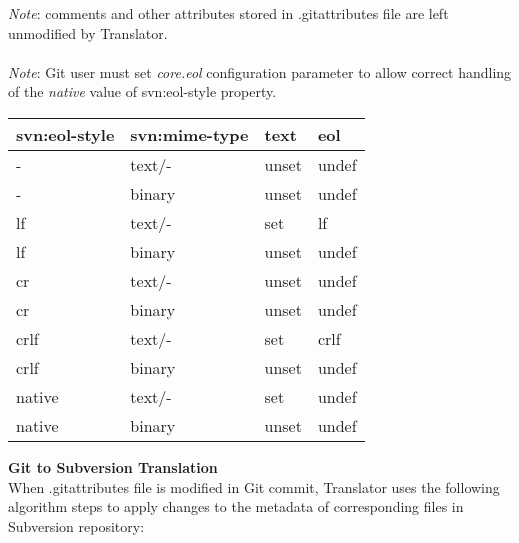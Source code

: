 \emph{Note}: comments and other attributes stored in .gitattributes file are left unmodified by Translator.\\
\\
\emph{Note}: Git user must set \emph{core.eol} configuration parameter to allow correct handling of the \emph{native} value of svn:eol-style property.
\clearpage
\begin{center}
\begin{tabular}{ | p{} | p{} | p{} | p{} |}
	\hline
	svn:eol-style &   svn:mime-type &   text  & eol \\ \hline \hline
	-             &   text\footnotemark[1]/-        &   unset & undef \\ \hline
	-             &   binary\footnotemark[1]        &   unset & undef \\ \hline
	lf            &   text/-        &   set   & lf \\ \hline
	lf            &   binary        &   unset & undef \\ \hline
	cr            &   text/-        &   unset & undef  \footnotemark[2] \\ \hline
	cr            &   binary        &   unset & undef \\ \hline
	crlf          &   text/-        &   set   & crlf \\ \hline
	crlf          &   binary        &   unset & undef \\ \hline
	native        &   text/-        &   set   & undef \footnotemark[3] \\ \hline
	native        &   binary        &   unset & undef \\ \hline
\end{tabular}
\label{eol_mime_svn_to_git}
\end{center}

\textbf{Git to Subversion Translation}\\

When .gitattributes file is modified in Git commit, Translator uses the following algorithm steps to apply changes to the metadata of corresponding files in Subversion repository:

